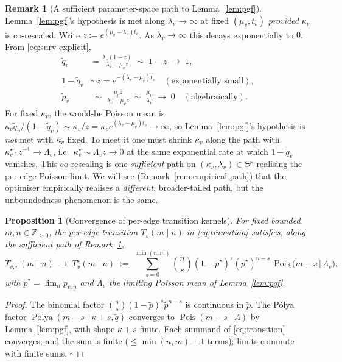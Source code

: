 \documentclass[11pt]{article}
\newcommand{\Z}{\mathbb{Z}}
\newcommand{\rate}{\kappa}             %
\newcommand{\dup}{\lambda}             %
\newcommand{\loss}{\mu}                %
\newcommand{\edgelen}{t}               %
\newcommand{\survp}{\tilde p}          %
\newcommand{\survq}{\tilde q}          %
\DeclareMathOperator{\Pol}{Polya}
\DeclareMathOperator{\Poi}{Pois}
\newtheorem{proposition}[theorem]{Proposition}
\theoremstyle{definition}
\newtheorem{remark}[theorem]{Remark}
\begin{document}
\begin{remark}[A sufficient parameter-space path to Lemma~\ref{lem:pgf}]
\label{rem:suffroute}
Lemma~\ref{lem:pgf}'s hypothesis is met along $\dup_v \to \infty$
at fixed $(\loss_v, \edgelen_v)$ \emph{provided} $\rate_v$ is
co-rescaled. Write $z := e^{(\loss_v - \dup_v)\edgelen_v}$. As
$\dup_v \to \infty$ this decays exponentially to $0$. From
\eqref{eq:surv-explicit},
\begin{align*}
\survq_v &= \tfrac{\dup_v(1 - z)}{\dup_v - \loss_v z}
       \;\sim\; 1 - z\;\longrightarrow\; 1,
\\
1 - \survq_v &\sim z = e^{-(\dup_v - \loss_v)\edgelen_v}
\quad(\text{exponentially small}),
\\
\survp_v &\;\sim\; \tfrac{\loss_v z}{\dup_v - \loss_v z}
       \;\sim\; \tfrac{\loss_v}{\dup_v}
       \;\longrightarrow\; 0
\quad(\text{algebraically}).
\end{align*}
For fixed $\rate_v$, the would-be Poisson mean is
$\rate_v \survq_v / (1 - \survq_v) \sim \rate_v / z
= \rate_v e^{(\dup_v - \loss_v)\edgelen_v} \to \infty$,
so Lemma~\ref{lem:pgf}'s hypothesis is \emph{not} met with $\rate_v$
fixed. To meet it one must shrink $\rate_v$ along the path with
$\rate^\star_v \cdot z^{-1} \to \Lambda_v$, i.e.\
$\rate^\star_v \sim \Lambda_v z \to 0$ at the same exponential rate
at which $1 - \survq_v$ vanishes.
This co-rescaling is one \emph{sufficient} path on
$(\rate_v, \dup_v) \in \Theta^\circ$ realising the per-edge Poisson
limit. We will see (Remark~\ref{rem:empirical-path}) that the
optimiser empirically realises a \emph{different}, broader-tailed
path, but the unboundedness phenomenon is the same.
\end{remark}

\begin{proposition}[Convergence of per-edge transition kernels]
\label{prop:edge-conv}
For fixed bounded $m, n \in \Z_{\ge 0}$, the per-edge transition
$T_v(m \mid n)$ in \eqref{eq:transition} satisfies, along the
sufficient path of Remark~\ref{rem:suffroute},
\begin{equation}
T_{v,n}(m \mid n) \;\longrightarrow\;
T^\star_v(m \mid n)
\;:=\;
\sum_{s=0}^{\min(n,m)} \binom{n}{s} (1-\survp^\star)^s (\survp^\star)^{n-s}\,
\Poi\bigl(m - s \,\big|\, \Lambda_v\bigr),
\label{eq:edge-limit}
\end{equation}
with $\survp^\star = \lim_n\survp_{v,n}$ and $\Lambda_v$ the limiting
Poisson mean of Lemma~\ref{lem:pgf}.
\end{proposition}
\begin{proof}
The binomial factor $\binom{n}{s}(1-\survp)^s\survp^{n-s}$ is
continuous in $\survp$. The Pólya factor
$\Pol(m - s \mid \rate + s, \survq)$ converges to
$\Poi(m - s \mid \Lambda)$ by Lemma~\ref{lem:pgf}, with shape
$\rate + s$ finite. Each summand of \eqref{eq:transition}
converges, and the sum is finite ($\le \min(n,m) + 1$ terms);
limits commute with finite sums. $\square$
\end{proof}
\end{document}
